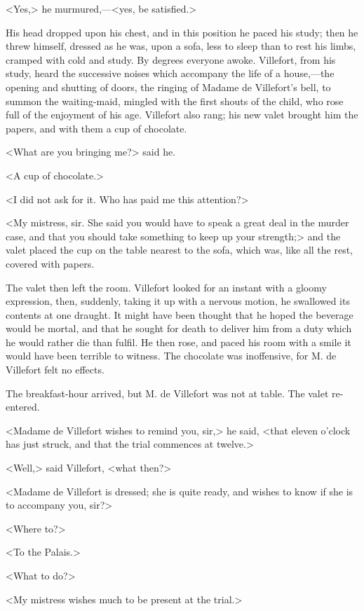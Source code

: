  <Yes,> he murmured,—<yes, be satisfied.> 

 His head dropped upon his chest, and in this position he paced his study; then he threw himself, dressed as he was, upon a sofa, less to sleep than to rest his limbs, cramped with cold and study. By degrees everyone awoke. Villefort, from his study, heard the successive noises which accompany the life of a house,—the opening and shutting of doors, the ringing of Madame de Villefort's bell, to summon the waiting-maid, mingled with the first shouts of the child, who rose full of the enjoyment of his age. Villefort also rang; his new valet brought him the papers, and with them a cup of chocolate. 

 <What are you bringing me?> said he. 

 <A cup of chocolate.> 

 <I did not ask for it. Who has paid me this attention?> 

 <My mistress, sir. She said you would have to speak a great deal in the murder case, and that you should take something to keep up your strength;> and the valet placed the cup on the table nearest to the sofa, which was, like all the rest, covered with papers. 

 The valet then left the room. Villefort looked for an instant with a gloomy expression, then, suddenly, taking it up with a nervous motion, he swallowed its contents at one draught. It might have been thought that he hoped the beverage would be mortal, and that he sought for death to deliver him from a duty which he would rather die than fulfil. He then rose, and paced his room with a smile it would have been terrible to witness. The chocolate was inoffensive, for M. de Villefort felt no effects. 

 The breakfast-hour arrived, but M. de Villefort was not at table. The valet re-entered. 

 <Madame de Villefort wishes to remind you, sir,> he said, <that eleven o'clock has just struck, and that the trial commences at twelve.> 

 <Well,> said Villefort, <what then?> 

 <Madame de Villefort is dressed; she is quite ready, and wishes to know if she is to accompany you, sir?> 

 <Where to?> 

 <To the Palais.> 

 <What to do?> 

 <My mistress wishes much to be present at the trial.> 

